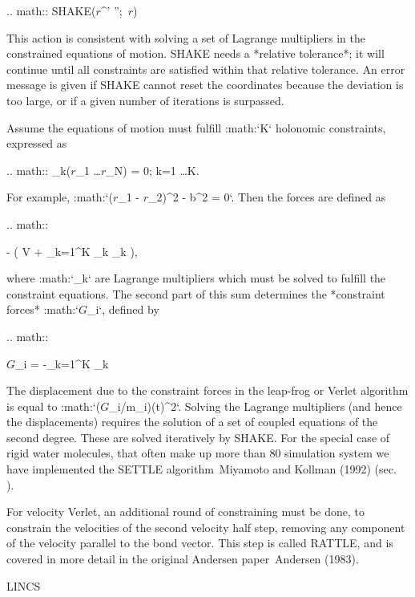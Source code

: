 {.. math:: {\rm SHAKE}({\mbox{\boldmath ${r}$}}^{'} '';\, {\mbox{\boldmath ${r}$}})

This action is consistent with solving a set of Lagrange multipliers in
the constrained equations of motion. SHAKE needs a *relative tolerance*;
it will continue until all constraints are satisfied within that
relative tolerance. An error message is given if SHAKE cannot reset the
coordinates because the deviation is too large, or if a given number of
iterations is surpassed.

Assume the equations of motion must fulfill :math:`K` holonomic
constraints, expressed as

.. math:: \sigma_k({\mbox{\boldmath ${r}$}}_1 \ldots {\mbox{\boldmath ${r}$}}_N) = 0; \;\; k=1 \ldots K.

For example,
:math:`({\mbox{\boldmath ${r}$}}_1 - {\mbox{\boldmath ${r}$}}_2)^2 - b^2 = 0`.
Then the forces are defined as

.. math::

   -  \left( V + \sum_{k=1}^K \lambda_k
   \sigma_k \right),

where :math:`\lambda_k` are Lagrange multipliers which must be solved
to fulfill the constraint equations. The second part of this sum
determines the *constraint forces* :math:`{\mbox{\boldmath ${G}$}}_i`,
defined by

.. math::

   {\mbox{\boldmath ${G}$}}_i = -\sum_{k=1}^K \lambda_k 

The displacement due to the constraint forces in the leap-frog or
Verlet algorithm is equal to
:math:`({\mbox{\boldmath ${G}$}}_i/m_i)({{\Delta t}})^2`. Solving the
Lagrange multipliers (and hence the displacements) requires the solution
of a set of coupled equations of the second degree. These are solved
iteratively by SHAKE.
For the special
case of rigid water molecules, that often make up more than 80%
simulation system we have implemented the
SETTLE
algorithm Miyamoto and Kollman (1992)
(sec. 
).

For velocity Verlet, an additional round of constraining must be done,
to constrain the velocities of the second velocity half step, removing
any component of the velocity parallel to the bond vector. This step is
called RATTLE, and is covered in more detail in the original Andersen
paper Andersen (1983).

LINCS
~~~~~

}
